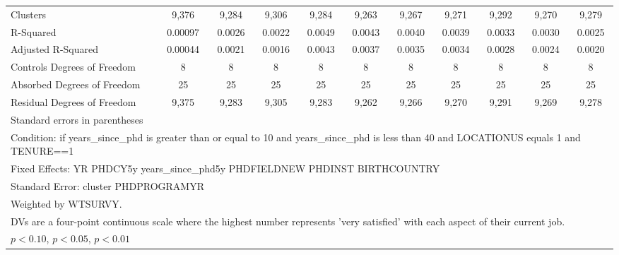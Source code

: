 \begin{table}[htbp]
\begin{tabular}{l*{10}{c}}
Clusters&       9,376         &       9,284         &       9,306         &       9,284         &       9,263         &       9,267         &       9,271         &       9,292         &       9,270         &       9,279         \\
R-Squared&     0.00097         &      0.0026         &      0.0022         &      0.0049         &      0.0043         &      0.0040         &      0.0039         &      0.0033         &      0.0030         &      0.0025         \\
Adjusted R-Squared&     0.00044         &      0.0021         &      0.0016         &      0.0043         &      0.0037         &      0.0035         &      0.0034         &      0.0028         &      0.0024         &      0.0020         \\
Controls Degrees of Freedom&           8         &           8         &           8         &           8         &           8         &           8         &           8         &           8         &           8         &           8         \\
Absorbed Degrees of Freedom&          25         &          25         &          25         &          25         &          25         &          25         &          25         &          25         &          25         &          25         \\
Residual Degrees of Freedom&       9,375         &       9,283         &       9,305         &       9,283         &       9,262         &       9,266         &       9,270         &       9,291         &       9,269         &       9,278         \\
\hline\hline
\multicolumn{11}{l}{\footnotesize Standard errors in parentheses}\\
\multicolumn{11}{l}{\footnotesize Condition: if years\_since\_phd is greater than or equal to 10 and years\_since\_phd is less than 40 and LOCATIONUS equals 1 and TENURE==1}\\
\multicolumn{11}{l}{\footnotesize Fixed Effects: YR PHDCY5y years\_since\_phd5y PHDFIELDNEW PHDINST BIRTHCOUNTRY}\\
\multicolumn{11}{l}{\footnotesize Standard Error: cluster PHDPROGRAMYR}\\
\multicolumn{11}{l}{\footnotesize Weighted by WTSURVY.}\\
\multicolumn{11}{l}{\footnotesize DVs are a four-point continuous scale where the highest number represents 'very satisfied' with each aspect of their current job.}\\
\multicolumn{11}{l}{\footnotesize \sym{*} \(p<0.10\), \sym{**} \(p<0.05\), \sym{***} \(p<0.01\)}\\
\end{tabular}
\end{table}
